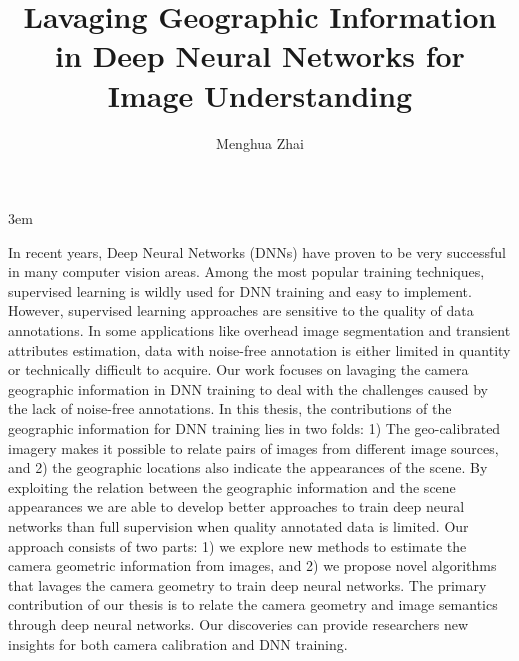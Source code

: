 \documentclass[final]{ukthesis}
\begin{document}
\emergencystretch 3em

\author{Menghua Zhai}
\title{Lavaging Geographic Information in Deep Neural Networks for Image Understanding}

\abstract
{ \SingleSpacing
In recent years, Deep Neural Networks (DNNs) have proven to be very
successful in many computer vision areas. Among the most popular
training techniques, supervised learning is wildly used for DNN
training and easy to implement. However, supervised
learning approaches are sensitive to the quality of data
annotations. In some applications like overhead image segmentation and
transient attributes estimation, data with noise-free annotation is
either limited in quantity or technically difficult to acquire.
Our work focuses on lavaging the camera geographic information in
DNN training to deal with the challenges caused by the lack of
noise-free annotations.
In this thesis, the contributions of the geographic information for
DNN training lies in two folds: 1) The geo-calibrated imagery makes it
possible to relate pairs of images from different image sources, and
2) the geographic locations also indicate the appearances of the
scene.
By exploiting the relation between the geographic information and the
scene appearances we are able to develop better approaches to train
deep neural networks than full supervision when quality annotated
data is limited.
Our approach consists of two parts: 1) we explore new methods
to estimate the camera geometric information from images, and 2) 
we propose novel algorithms that lavages the camera geometry to train
deep neural networks.
The primary contribution of our thesis is to relate the camera
geometry and image semantics through deep neural networks. Our
discoveries can provide researchers new insights for both camera
calibration and DNN training.
}


\frontmatter
\maketitle



\tableofcontents\clearpage

\mainmatter




\backmatter




\end{document}
